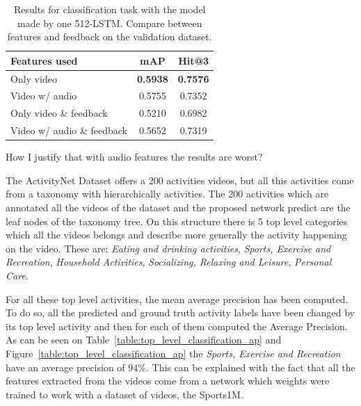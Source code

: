 \begin{table}[H]
\begin{center}
\begin{tabular}{|l|c|c|}
\hline
Features used & mAP & Hit@3 \\
\hline\hline
Only video & \bf0.5938 & \bf0.7576 \\
Video w/ audio & 0.5755 & 0.7352 \\
Only video \& feedback & 0.5210 & 0.6982 \\
Video w/ audio \& feedback & 0.5652 & 0.7319 \\
\hline
\end{tabular}
\end{center}
\caption{Results for classification task with the model made by one 512-LSTM. Compare between
         features and feedback on the validation dataset.}
\label{table:classification_by_features}
\end{table}

How I justify that with audio features the results are worst?

The ActivityNet Dataset offers a 200 activities videos, but all this activities come from a taxonomy with hierarchically activities. The 200 activities which are annotated all the videos of the dataset and the proposed network predict are the leaf nodes of the taxonomy tree. On this structure there is 5 top level categories which all the videos belongs and describe more generally the activity happening on the video. These are: \textit{Eating and drinking activities}, \textit{Sports, Exercise and Recreation}, \textit{Household Activities}, \textit{Socializing, Relaxing and Leisure}, \textit{Personal Care}.

For all these top level activities, the mean average precision has been computed. To do so, all the predicted and ground truth activity labels have been changed by its top level activity and then for each of them computed the Average Precision. As can be seen on Table~\ref{table:top_level_classification_ap} and Figure~\ref{table:top_level_classification_ap} the \textit{Sports, Exercise and Recreation} have an average precision of $94\%$. This can be explained with the fact that all the features extracted from the videos come from a network which weights were trained to work with a dataset of videos, the Sports1M\cite{KarpathyCVPR14}.

